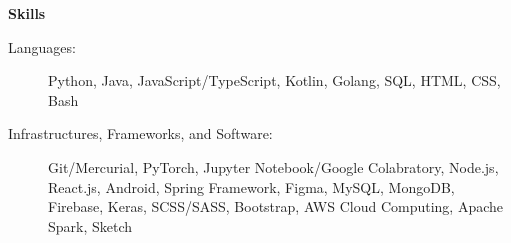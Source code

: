 \documentclass[letterpaper,10pt]{article}
\makeatletter
\newcommand{\resitem}[1]{\item #1 \vspace{-3.5pt}}  %
\newcommand{\resheading}[1]{{\large \colorbox{mygrey}{\begin{minipage}{0.989\textwidth}{\textbf{#1 \vphantom{p\^{E}}}}\end{minipage}}}}
\newcommand{\ressubheading}[4]{
\begin{tabular*}{7.0in}{l@{\extracolsep{\fill}}r}  
		\textbf{#1} & #2 \\
		\textit{#3} & \textit{#4} \\
\end{tabular*}\vspace{-6pt}}  %
\makeatother
\begin{document}


\resheading{Skills}

\begin{description}
\item[Languages:] Python, Java, JavaScript/TypeScript, Kotlin, Golang, SQL, HTML, CSS, Bash
\item[Infrastructures, Frameworks, and Software:] Git/Mercurial, PyTorch, Jupyter Notebook/Google Colabratory, Node.js, React.js, Android, Spring Framework, Figma, MySQL, MongoDB, Firebase, Keras, SCSS/SASS, Bootstrap, AWS Cloud Computing, Apache Spark, Sketch
\end{description}



\end{document}
